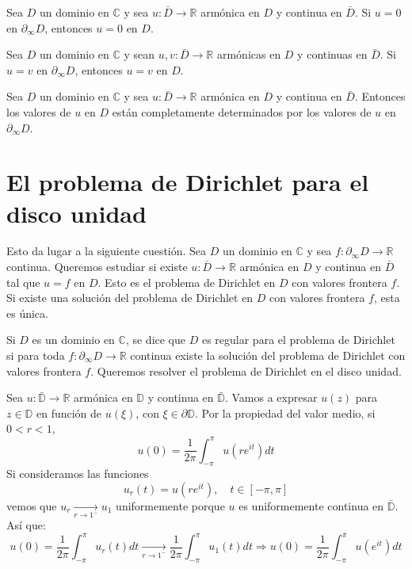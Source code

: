 \begin{corollary}
    Sea $D$ un dominio en $\mathbb{C}$ y sea $u: \bar{D} \to \mathbb{R}$ armónica en $D$ y continua en $\bar{D}$.
    Si $u = 0$ en $\partial_\infty D$, entonces $u = 0$ en $D$.
\end{corollary}

\begin{corollary}
    Sea $D$ un dominio en $\mathbb{C}$ y sean $u, v: \bar{D} \to \mathbb{R}$ armónicas en $D$ y continuas en $\bar{D}$.
    Si $u = v$ en $\partial_\infty D$, entonces $u = v$ en $D$.
\end{corollary}

\begin{remark}
    Sea $D$ un dominio en $\mathbb{C}$ y sea $u: \bar{D} \to \mathbb{R}$ armónica en $D$ y continua en $\bar{D}$.
    Entonces los valores de $u$ en $D$ están completamente determinados por los valores de $u$ en $\partial_\infty D$.
\end{remark}

\section{El problema de Dirichlet para el disco unidad}
Esto da lugar a la siguiente cuestión.
Sea $D$ un dominio en $\mathbb{C}$ y sea $f: \partial_\infty D \to \mathbb{R}$ continua.
Queremos estudiar si existe $u: \bar{D} \to \mathbb{R}$ armónica en $D$ y continua en $\bar{D}$ tal que $u = f$ en $D$.
Esto es el problema de Dirichlet en $D$ con valores frontera $f$.
Si existe una solución del problema de Dirichlet en $D$ con valores frontera $f$, esta es única.

Si $D$ es un dominio en $\mathbb{C}$, se dice que $D$ es regular para el problema de Dirichlet si para toda $f: \partial_\infty D \to \mathbb{R}$ continua existe la solución del problema de Dirichlet con valores frontera $f$.
Queremos resolver el problema de Dirichlet en el disco unidad.

Sea $u: \bar{\mathbb{D}} \to \mathbb{R}$ armónica en $\mathbb{D}$ y continua en $\bar{\mathbb{D}}$.
Vamos a expresar $u(z)$ para $z \in \mathbb{D}$ en función de $u(\xi)$, con $\xi \in \partial\mathbb{D}$.
Por la propiedad del valor medio, si $0 < r < 1$,
$$u(0) = \frac{1}{2\pi} \int_{-\pi}^\pi u(re^{it})dt$$
Si consideramos las funciones
$$u_r(t) = u(re^{it}), \quad t \in [-\pi, \pi]$$
vemos que $u_r \xrightarrow[r \to 1^-]{} u_1$ uniformemente porque $u$ es uniformemente continua en $\bar{\mathbb{D}}$.
Así que:
$$u(0) = \frac{1}{2\pi} \int_{-\pi}^\pi u_r(t)dt \xrightarrow[r \to 1^-]{} \frac{1}{2\pi} \int_{-\pi}^\pi u_1(t)dt \Rightarrow u(0) = \frac{1}{2\pi} \int_{-\pi}^\pi u(e^{it})dt$$

